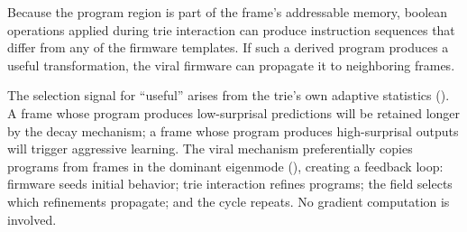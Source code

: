 Because the program region is part of the frame's addressable memory,
boolean operations applied during trie interaction can produce
instruction sequences that differ from any of the firmware templates.
If such a derived program produces a useful transformation, the viral
firmware can propagate it to neighboring frames.

The selection signal for ``useful'' arises from the trie's own adaptive
statistics ().  A frame whose program produces
low-surprisal predictions will be retained longer by the decay
mechanism; a frame whose program produces high-surprisal outputs will
trigger aggressive learning.  The viral mechanism preferentially copies
programs from frames in the dominant eigenmode
(), creating a feedback loop: firmware seeds initial
behavior; trie interaction refines programs; the field selects which
refinements propagate; and the cycle repeats.  No gradient computation
is involved.
